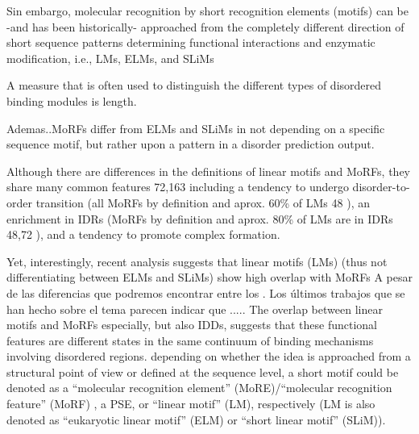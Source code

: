 Sin embargo, molecular recognition by short recognition elements (motifs)
can be -and has been historically- approached from the
completely different direction of short sequence patterns
determining functional interactions and enzymatic modification,
i.e., LMs, ELMs, and SLiMs




 
% 

A measure that is often used to distinguish the different types of
disordered binding modules is length.

Ademas..MoRFs differ from ELMs and SLiMs in not depending on a specific sequence motif, but rather upon a pattern in a disorder prediction output. 

Although there are differences in the definitions of linear
motifs and MoRFs, they share many common features 72,163
including a tendency to undergo disorder-to-order transition (all
MoRFs by definition and aprox. 60\% of LMs 48 ), an enrichment in
IDRs (MoRFs by definition and aprox. 80\% of LMs are in IDRs 48,72 ),
and a tendency to promote complex formation.



Yet, interestingly, recent analysis suggests that linear motifs (LMs) (thus not differentiating between ELMs and SLiMs) show high overlap with MoRFs \cite{fuxreiter2007local}
A pesar de las diferencias que podremos encontrar entre los . Los últimos trabajos que se han hecho sobre el tema \cite{meszaros2012disordered, fuxreiter2007local} 
parecen indicar que .....
The overlap between linear motifs and MoRFs
especially, but also IDDs, suggests that these functional features
are different states in the same continuum of binding
mechanisms involving disordered regions.
depending
on whether the idea is approached from a structural point of view
or defined at the sequence level, a short motif could be denoted
as a “molecular recognition element” (MoRE)/“molecular
recognition feature” (MoRF) , a PSE, or “linear motif” (LM),
respectively (LM is also denoted as “eukaryotic linear motif”
(ELM) or “short linear motif” (SLiM)).



